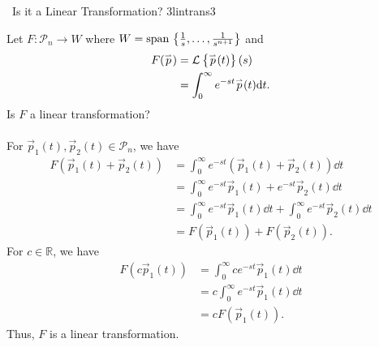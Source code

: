         \begin{example}{\Difficulty\,\Difficulty\,\,Is it a Linear Transformation? 3}{lintrans3}

            Let \(F:\mathcal{P}_{n}\to W\) where \(W=\text{span\,}\left\{\frac{1}{s},\ldots,\frac{1}{s^{n+1}}\right\}\) and
            \begin{align*}
                F(\overset{_{\rightharpoonup}}{p})&=\mathcal{L}^{}\left\{\overset{_{\rightharpoonup}}{p}(t)\right\}(s) \\
                &=\int_0^\infty e^{-st}\overset{_{\rightharpoonup}}{p}(t)\text{d} t.
            \end{align*}
            Is \(F\) a linear transformation?
            \\
            \\
            For \(\vec{p}_1(t),\vec{p}_2(t)\in\mathcal{P}_n\), we have
            \begin{align*}
                F(\vec{p}_1(t)+\vec{p}_2(t))&=\int_0^\infty e^{-st}(\vec{p}_1(t)+\vec{p}_2(t))\dd t \\
                &=\int_0^\infty e^{-st}\vec{p}_1(t)+e^{-st}\vec{p}_2(t)\dd t \\
                &=\int_0^\infty e^{-st}\vec{p}_1(t)\dd t+\int_0^\infty e^{-st}\vec{p}_2(t)\dd t \\
                &=F(\vec{p}_1(t))+F(\vec{p}_2(t)).
            \end{align*}
            For \(c\in\mathbb{R}\), we have 
            \begin{align*}
                F(c\vec{p}_1(t))&=\int_0^\infty ce^{-st}\vec{p}_1(t)\dd t \\
                &=c\int_0^\infty e^{-st}\vec{p}_1(t)\dd t \\
                &=cF(\vec{p}_1(t)).
            \end{align*}
            Thus, \(F\) is a linear transformation.
        \end{example}
        \pagebreak
